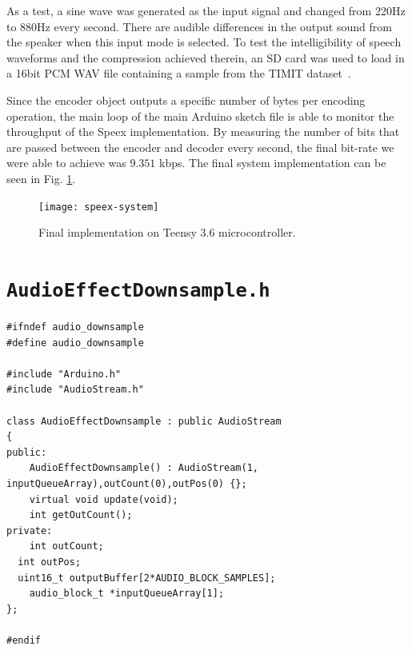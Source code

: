 \documentclass[letterpaper]{article}
\begin{document}
As a test, a sine wave was generated as the input signal and changed from 220Hz to 880Hz every second. There are audible differences in the output sound from the speaker when this input mode is selected. To test the intelligibility of speech waveforms and the compression achieved therein, an SD card was used to load in a 16bit PCM WAV file containing a sample from the TIMIT dataset~\cite{timit}.

Since the encoder object outputs a specific number of  bytes per encoding operation, the main loop of the main Arduino sketch file is able to monitor the throughput of the Speex implementation. By measuring the number of bits that are passed between the encoder and decoder every second, the final bit-rate we were able to achieve was $9.351$ kbps. The final system implementation can be seen in Fig. \ref{fig:imp}.


\begin{figure}[h!]
    \centering
    \texttt{[image: speex-system]}
    \caption{Final implementation on Teensy 3.6 microcontroller.}
    \label{fig:imp}
\end{figure}

\newpage

\appendix
\section{\texttt{AudioEffectDownsample.h}}
\begin{verbatim}
#ifndef audio_downsample
#define audio_downsample

#include "Arduino.h"
#include "AudioStream.h"

class AudioEffectDownsample : public AudioStream
{
public:
	AudioEffectDownsample() : AudioStream(1, inputQueueArray),outCount(0),outPos(0) {};
	virtual void update(void);
	int getOutCount();
private:
	int outCount;
  int outPos;
  uint16_t outputBuffer[2*AUDIO_BLOCK_SAMPLES];
	audio_block_t *inputQueueArray[1];
};

#endif
\end{verbatim}
\end{document}

